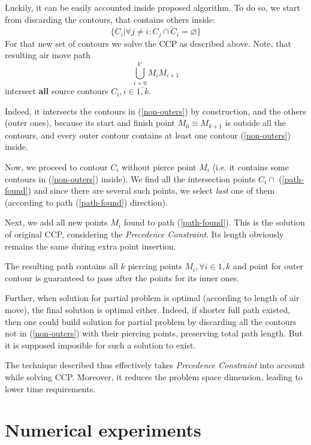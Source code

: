 \documentclass{ifacconf}
\begin{document}
Luckily, it can be easily accounted
inside proposed algorithm.
To do so,
we start from discarding the contours,
that contains others inside:
\begin{equation}
\big\{
    C_i | \forall j \ne i: C_j \cap \tilde C_i = \varnothing
\big\}
\label{non-outers}
\end{equation}
For that new set of contours
we solve the CCP as described above.
Note, that resulting air move path
\begin{equation}
  \bigcup_{i=0}^{k'} M_i M_{i+1}
\label{path-found}
\end{equation}
intersect \textbf{all}
source contours
$C_i, i \in \overline{1,k}$.

Indeed,
it intersects the contours in (\ref{non-outers})
by construction,
and the others
(outer ones),
because
its start and finish point
$M_0 \equiv M_{k+1}$
is outside all the contours,
and every outer contour
contains at least one contour
(\ref{non-outers}) inside.

Now,
we proceed to contour $C_i$
without pierce point $M_i$
(i.e. it contains some contours in
(\ref{non-outers}) inside).
We find all the intersection
points $C_i \cap $ (\ref{path-found})
and since there are several such points,
we select \textit{last} one of them
(according to path (\ref{path-found}) direction).

Next, we add all new points $M_i$ found
to path (\ref{path-found}).
This is the solution of original CCP,
considering the
\textit{Precedence Constraint}.
Its length obviously remains the same
during extra point insertion.

The resulting path contains all $k$
piercing points
$M_i, \forall i \in \overline{1,k}$
and point for outer contour
is guaranteed to pass after
the points for its inner ones.

Further,
when solution for partial problem
is optimal
(according to length of air move),
the final solution
is optimal either.
Indeed,
if shorter full path existed,
then one could build solution
for partial problem
by discarding all the contours not in
(\ref{non-outers}) with their piercing points,
preserving total path length.
But it is supposed imposible
for such a solution to exist.

The technique described thus
effectively takes
\textit{Precedence Constraint}
into account while solving CCP.
Moreover,
it reduces the problem space dimension,
leading to lower time requirements.

\section{Numerical experiments}
\end{document}
